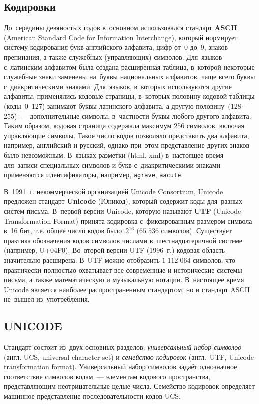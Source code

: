 \documentclass[12pt]{article}
\theoremstyle{definition}
\theoremstyle{remark}
\numberwithin{equation}{section}
\begin{document}
\subsection{Кодировки}
До~середины девяностых годов в~основном использовался стандарт \textbf{ASCII}
(American Standard Code for Information Interchange), который нормирует систему
кодирования букв английского алфавита, цифр от~0 до~9, знаков препинания, а также
служебных (управляющих) символов. Для~языков с~латинским алфавитом была создана
расширенная таблица, в~которой некоторые служебные знаки заменены на~буквы
национальных алфавитов, чаще всего буквы с~диакритическими знаками. Для~языков,
в~которых используются другие алфавиты, применялись кодовые страницы, в~которых
половину кодовой таблицы (коды~0--127) занимают буквы латинского алфавита,
а другую половину~(128--255)~--- дополнительные символы, в~частности буквы любого
другого алфавита. Таким образом, кодовая страница содержала максимум 256 символов,
включая управляющие символы. Такое число кодов позволяло представить два алфавита,
например, английский и русский, однако при~этом представление других знаков
было невозможным. В~языках разметки (html, xml) в~настоящее время для~записи
специальных символов и букв с~диакритическими знаками применяются идентификаторы,
например, \texttt{agrave}, \texttt{aacute}.

В~1991~г. некоммерческой организацией Unicode Consortium, Unicode предложен стандарт
\textbf{Unicode} (Юникод), который содержит коды для~разных систем письма.
В~первой версии Unicode, которую называют \textbf{UTF} (Unicode
Transformation Format) принята кодировка с~фиксированным размером символа в~16 бит,
т.е. общее число кодов было~$2^{16}$ ($65\;536$ символов). Существует практика
обозначения кодов символов числами в~шестнадцатеричной системе (например, U+04F0).
Во~второй версии UTF (1996~г.) кодовая область значительно расширена.
В~UTF можно отобразить $1\;112\;064$ символов, что практически полностью
охватывает все современные и исторические системы письма, а также математическую
и музыкальную нотации. В~настоящее время Unicode является наиболее распространенным
стандартом, но и стандарт ASCII не~вышел из~употребления.

\subsection{UNICODE}
Стандарт состоит из~двух основных разделов: \textsl{универсальный набор символов}
(англ. UCS, universal character set) и \textsl{семейство кодировок} (англ.~UTF,
Unicode transformation format). Универсальный набор символов задаёт однозначное
соответствие символов кодам~--- элементам кодового пространства, представляющим
неотрицательные целые числа. Семейство кодировок определяет машинное представление
последовательности кодов UCS.
\end{document}
